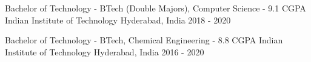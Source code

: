 

\begin{cventries}
\vspace{-1mm}

  \cventry
    {Bachelor of Technology - BTech (Double Majors), Computer Science - 9.1 CGPA} %
    {Indian Institute of Technology} %
    {Hyderabad, India} %
    {2018 - 2020} %
    {
    }

  \vspace{-5mm}
    
  \cventry
    {Bachelor of Technology - BTech, Chemical Engineering - 8.8 CGPA} %
    {Indian Institute of Technology} %
    {Hyderabad, India} %
    {2016 - 2020} %
    {
    }
\end{cventries}

\vspace{-6mm}